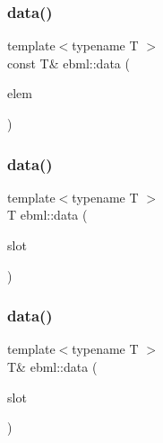 \mbox{\label{namespaceebml_a9b10dec5a642a1703033296c3e892946}} 
\subsubsection{\texorpdfstring{data()}{data()}\hspace{0.1cm}{\footnotesize\ttfamily [3/5]}}
{\footnotesize\ttfamily template$<$typename T $>$ \\
const T\& ebml\+::data (\begin{DoxyParamCaption}\item[{const \mbox{\hyperlink{namespaceebml_a2deef4e8071531b32e3533f1bf978917}{c\+\_\+ebml\+Element\+\_\+sp}} \&}]{elem }\end{DoxyParamCaption})}

\mbox{\label{namespaceebml_a766ff55857f1018516a926913abc8a83}} 
\subsubsection{\texorpdfstring{data()}{data()}\hspace{0.1cm}{\footnotesize\ttfamily [4/5]}}
{\footnotesize\ttfamily template$<$typename T $>$ \\
T ebml\+::data (\begin{DoxyParamCaption}\item[{const \mbox{\hyperlink{classebml_1_1const__slot__t}{const\+\_\+slot\+\_\+t}} \&}]{slot }\end{DoxyParamCaption})}

\mbox{\label{namespaceebml_ad2539ebb0462e9038828f80590adf688}} 
\subsubsection{\texorpdfstring{data()}{data()}\hspace{0.1cm}{\footnotesize\ttfamily [5/5]}}
{\footnotesize\ttfamily template$<$typename T $>$ \\
T\& ebml\+::data (\begin{DoxyParamCaption}\item[{\mbox{\hyperlink{classebml_1_1slot__t}{slot\+\_\+t}} \&}]{slot }\end{DoxyParamCaption})}

